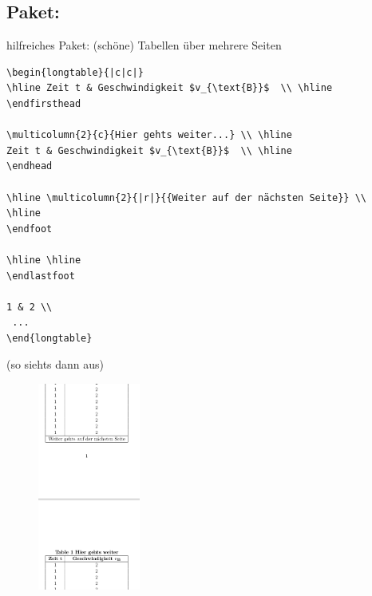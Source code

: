 \subsection{Paket: }

\begin{frame}[fragile]{hilfreiches Paket: }
(schöne) Tabellen über mehrere Seiten

\footnotesize
\begin{codeblock}
\begin{Verbatim}[fontsize=\tiny]  
\begin{longtable}{|c|c|}
\hline Zeit t & Geschwindigkeit $v_{\text{B}}$  \\ \hline 
\endfirsthead

\multicolumn{2}{c}{Hier gehts weiter...} \\ \hline 
Zeit t & Geschwindigkeit $v_{\text{B}}$  \\ \hline 
\endhead

\hline \multicolumn{2}{|r|}{{Weiter auf der nächsten Seite}} \\ 
\hline
\endfoot

\hline \hline
\endlastfoot

1 & 2 \\ 
 ...
\end{longtable}
\end{Verbatim}
\end{codeblock}
\end{frame}

\begin{frame}[fragile]{(so siehts dann aus)}
\begin{figure}
 \includegraphics[width=0.3\textwidth]{images/longtable_v2.png}
\end{figure}

\end{frame}

